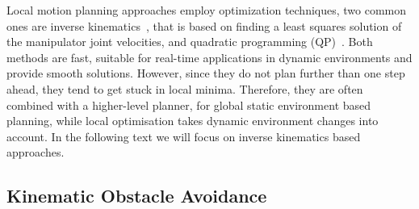 \documentclass[letterpaper, 10 pt, conference]{ieeeconf}  %
\begin{document}
Local motion planning approaches employ optimization techniques, two common ones are inverse kinematics~\cite{c29,c38}, that is based on finding a least squares solution of the manipulator joint velocities, and quadratic programming (QP)~\cite{c21,c22, haviland2021neo, c23}.  Both methods are fast, suitable for real-time applications in dynamic environments and provide smooth solutions. However, since they do not plan further than one step ahead, they tend to get stuck in local minima. Therefore, they are often combined with a higher-level planner, for global static environment based  planning, while local optimisation takes dynamic environment changes into account. In the following text we will focus on inverse kinematics based approaches.

\subsection{Kinematic Obstacle Avoidance}


\end{document}
